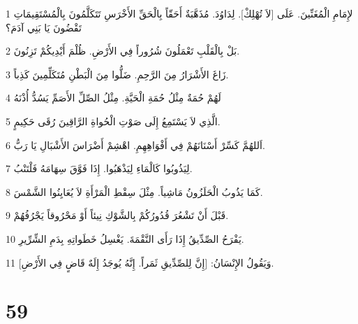 \par 1 لإِمَامِ الْمُغَنِّينَ. عَلَى [لاَ تُهْلِكْ]. لِدَاوُدَ. مُذَهَّبَةٌ أَحَقّاً بِالْحَقِّ الأَخْرَسِ تَتَكَلَّمُونَ بِالْمُسْتَقِيمَاتِ تَقْضُونَ يَا بَنِي آدَمَ؟
\par 2 بَلْ بِالْقَلْبِ تَعْمَلُونَ شُرُوراً فِي الأَرْضِ. ظُلْمَ أَيْدِيكُمْ تَزِنُونَ.
\par 3 زَاغَ الأَشْرَارُ مِنَ الرَّحِمِ. ضَلُّوا مِنَ الْبَطْنِ مُتَكَلِّمِينَ كَذِباً.
\par 4 لَهُمْ حُمَةٌ مِثْلُ حُمَةِ الْحَيَّةِ. مِثْلُ الصِّلِّ الأَصَمِّ يَسُدُّ أُذْنَهُ
\par 5 الَّذِي لاَ يَسْتَمِعُ إِلَى صَوْتِ الْحُواةِ الرَّاقِينَ رُقَى حَكِيمٍ.
\par 6 اَللهُمَّ كَسِّرْ أَسْنَانَهُمْ فِي أَفْوَاهِهِمِ. اهْشِمْ أَضْرَاسَ الأَشْبَالِ يَا رَبُّ.
\par 7 لِيَذُوبُوا كَالْمَاءِ لِيَذْهَبُوا. إِذَا فَوَّقَ سِهَامَهُ فَلْتَنْبُ.
\par 8 كَمَا يَذُوبُ الْحَلَزُونُ مَاشِياً. مِثْلَ سِقْطِ الْمَرْأَةِ لاَ يُعَايِنُوا الشَّمْسَ.
\par 9 قَبْلَ أَنْ تَشْعُرَ قُدُورُكُمْ بِالشَّوْكِ نِيئاً أَوْ مَحْرُوقاً يَجْرُفُهُمْ.
\par 10 يَفْرَحُ الصِّدِّيقُ إِذَا رَأَى النَّقْمَةَ. يَغْسِلُ خَطَواتِهِ بِدَمِ الشِّرِّيرِ.
\par 11 وَيَقُولُ الإِنْسَانُ: [إِنَّ لِلصِّدِّيقِ ثَمَراً. إِنَّهُ يُوجَدُ إِلَهٌ قَاضٍ فِي الأَرْضِ].

\chapter{59}


